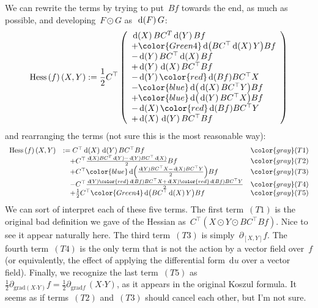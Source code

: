 We can rewrite the terms by trying to put~$Bf$ towards the end, as much as
possible, and developing~$F\odot G$ as~$\,\mathrm{d}\!\left(F\right)G$:
\begin{equation*}
	\mathrm{Hess}\left(f\right)(X,Y) :=
	\frac12C^\top\left(
		\begin{array}{l}
			\diag{X}BC^T\diag{Y}Bf\\
			+{\color{Green4}\diag{BC^\top\diag{X}Y}}Bf\\
			-\diag{Y}BC^\top\diag{X}Bf\\
			+\diag{Y}\diag{X}BC^\top Bf\\
			-\diag{Y}{\color{red}\diag{Bf}}BC^\top X\\
			-{\color{blue}\diag{\diag{X}BC^\top Y}}Bf\\
			+{\color{blue}\diag{\diag{Y}BC^\top X}}Bf\\
			-\diag{X}{\color{red}\diag{Bf}}BC^\top Y\\
			+\diag{X}\diag{Y}BC^\top Bf
		\end{array}
	\right)
\end{equation*}
and rearranging the terms (not sure this is the most reasonable way):
\begin{equation*}
	\begin{array}{lll}
		\mathrm{Hess}\left(f\right)(X,Y) & :=
		C^\top\diag{X}\diag{Y}BC^\top Bf &{\color{gray}
		\small(T1)}\\
		&\quad +C^\top\frac{\diag{X}BC^T\diag{Y}-\diag{Y}BC^\top\diag{X}}2Bf &{\color{gray}
		\small(T2)}\\
		&\quad +C^\top{\color{blue}\diag{\frac{
			{\diag{Y}BC^\top X}-\diag{X}BC^\top Y}2
	}}Bf &{\color{gray}
	\small(T3)}\\
		&\quad -C^\top\frac{\diag{Y}{\color{red}\diag{Bf}}BC^\top X
			+\diag{X}{\color{red}\diag{Bf}}BC^\top Y
		}2 &{\color{gray}
		\small(T4)}\\
		&\quad +\frac12 C^\top{\color{Green4}\diag{BC^\top\diag{X}Y}}Bf &{\color{gray}
		\small(T5)}\\
	\end{array}
\end{equation*}
We can sort of interpret each of these five terms.  The first term~$(T1)$ is
the original bad definition we gave of the Hessian as~$C^\top(X\odot Y\odot
BC^\top Bf)$.  Nice to see it appear naturally here.
The third term~$(T3)$ is simply~$\partial_{[X,Y]} f$.  The
fourth term~$(T4)$ is the only term that is not the action by a vector field
over~$f$ (or equivalently, the effect of applying the differential
form~$\mathrm{d}u$ over a vector field).  Finally, we recognize the last
term~$(T5)$ as~$\frac12\partial_{\mathrm{grad}\left(X\boldsymbol{\cdot}
Y\right)}f=\frac12\partial_{\mathrm{grad} f}\,\left(X\boldsymbol{\cdot}
Y\right)$, as it appears in the original Koszul formula.
It seems as if terms~$(T2)$ and~$(T3)$ should cancel each other, but I'm not
sure.

